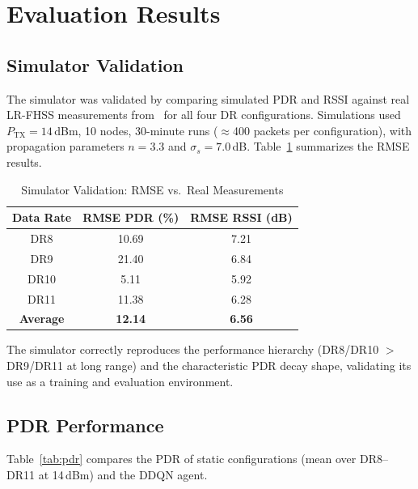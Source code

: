 \documentclass[conference]{IEEEtran}
\begin{document}
	\section{Evaluation Results}
	\label{sec:eval}
	
	\subsection{Simulator Validation}
	
	The simulator was validated by comparing simulated PDR and RSSI against
	real LR-FHSS measurements from~\cite{lrfhss_comparaison,sanchez_vital_2025_data}
	for all four DR configurations. Simulations used $P_{\text{TX}} = 14$\,dBm, 10
	nodes, 30-minute runs ($\approx$400 packets per configuration), with propagation
	parameters $n = 3.3$ and $\sigma_s = 7.0$\,dB. Table~\ref{tab:validation}
	summarizes the RMSE results.
	
	\begin{table}[!t]
		\centering
		\caption{Simulator Validation: RMSE vs.\ Real Measurements}
		\label{tab:validation}
		\begin{tabular}{|c|c|c|}
			\hline
			\textbf{Data Rate} & \textbf{RMSE PDR (\%)} & \textbf{RMSE RSSI (dB)} \\
			\hline
			DR8  & 10.69 & 7.21 \\
			DR9  & 21.40 & 6.84 \\
			DR10 & 5.11  & 5.92 \\
			DR11 & 11.38 & 6.28 \\
			\hline
			\textbf{Average} & \textbf{12.14} & \textbf{6.56} \\
			\hline
		\end{tabular}
	\end{table}
	
	The simulator correctly reproduces the performance hierarchy (DR8/DR10 $>$
	DR9/DR11 at long range) and the characteristic PDR decay shape, validating
	its use as a training and evaluation environment.
	
	\subsection{PDR Performance}
	
	Table~\ref{tab:pdr} compares the PDR of static configurations (mean over
	DR8--DR11 at 14\,dBm) and the DDQN agent.
	
\end{document}
